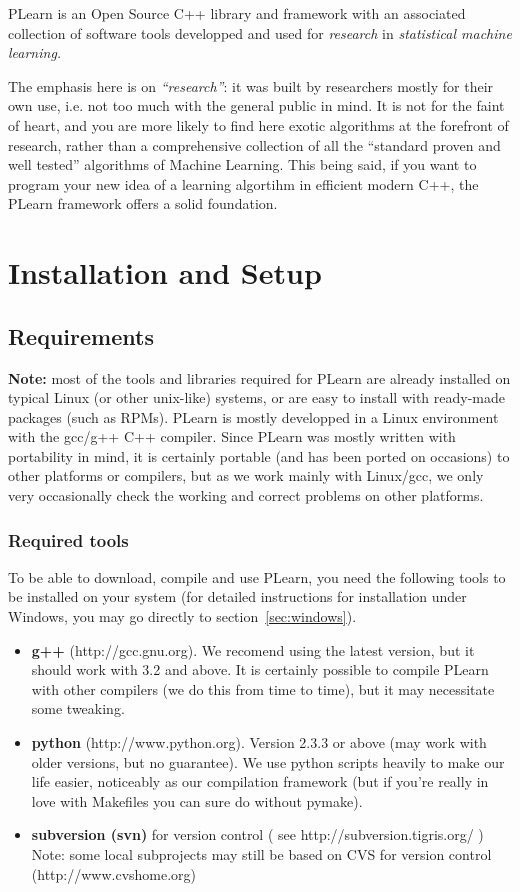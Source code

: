 \documentclass[11pt]{book}
\begin{document}
PLearn is an Open Source C++ library and framework with an associated
collection of software tools developped and used for \emph{research} in
\emph{statistical machine learning.} 

The emphasis here is on \emph{``research''}: it was built by researchers
mostly for their own use, i.e. not too much with the general public in
mind. It is not for the faint of heart, and you are more likely to
find here exotic algorithms at the forefront of research, rather than a
comprehensive collection of all the ``standard proven and well tested''
algorithms of Machine Learning. This being said, if you want to program
your new idea of a learning algortihm in efficient modern C++, the PLearn
framework offers a solid foundation.

\chapter{Installation and Setup}
\label{chap:label}

\section{Requirements}

{\bf Note:} most of the tools and libraries required for PLearn are already
installed on typical Linux (or other unix-like) systems, or are easy to
install with ready-made packages (such as RPMs). PLearn is mostly
developped in a Linux environment with the gcc/g++ C++ compiler.  Since
PLearn was mostly written with portability in mind, it is certainly
portable (and has been ported on occasions) to other platforms or
compilers, but as we work mainly with Linux/gcc, we only very occasionally
check the working and correct problems on other platforms.


\subsection{Required tools}

To be able to download, compile and use PLearn, you need the following
tools to be installed on your system (for detailed instructions for
installation under Windows,
you may go directly to section~\ref{sec:windows}).
\begin{itemize}
\item {\bf g++} (http://gcc.gnu.org). We recomend using the latest version,
  but it should work with 3.2 and above. It is certainly possible to
  compile PLearn with other compilers (we do this from time to time), but
  it may necessitate some tweaking.
\item {\bf python} (http://www.python.org). Version 2.3.3 or above (may
  work with older versions, but no guarantee). We use python scripts
  heavily to make our life easier, noticeably as our compilation framework
  (but if you're really in love with Makefiles you can sure do without
  pymake).
\item {\bf subversion (svn)} for version control ( see http://subversion.tigris.org/ )
Note: some local subprojects may still be based on CVS for version control (http://www.cvshome.org)
\end{itemize}
\end{document}
